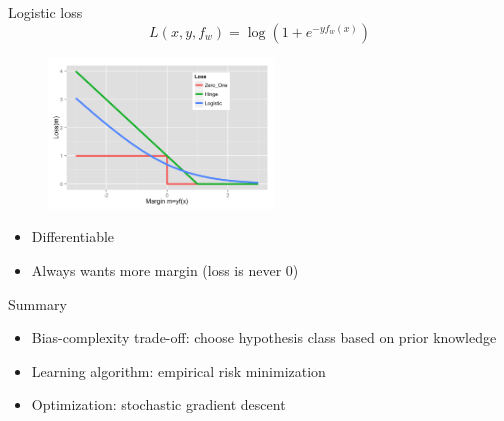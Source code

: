 \documentclass[usenames,dvipsnames,notes,11pt,aspectratio=169]{beamer}
\begin{document}
\begin{frame}
    {Logistic loss}
    $$
    L(x,y,f_w) = \log(1+e^{-yf_w(x)})
    $$
    \begin{figure}
        \includegraphics[height=4cm]{figures/loss.Zero_One.Hinge.Logistic.png}
    \end{figure}
    \begin{itemize}
        \item Differentiable
        \item Always wants more margin (loss is never 0)
    \end{itemize}
\end{frame}

\begin{frame}
    {Summary}
    \begin{itemize}
        \itemsep2em
        \item Bias-complexity trade-off: choose hypothesis class based on prior knowledge
        \item Learning algorithm: empirical risk minimization
        \item Optimization: stochastic gradient descent
    \end{itemize}
\end{frame}
\end{document}
